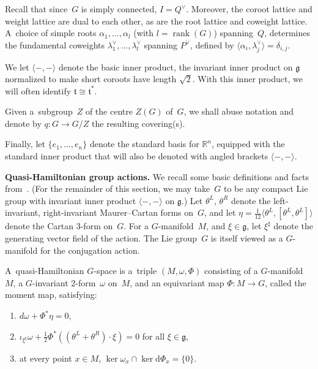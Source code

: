 \documentclass[11pt]{article}
\numberwithin{equation}{section}
\DeclareMathOperator{\rank}{rank}
\begin{document}
Recall that since~$G$ is simply connected, $I=Q^\vee$.
Moreover, the coroot lattice and weight lattice are dual to each other, as are the root lattice and coweight lattice.
A~choice of simple roots $\alpha_1, \ldots, \alpha_l$ (with $l=\rank(G)$) spanning~$Q$, determines the fundamental
coweights $\lambda_1^\vee, \ldots, \lambda_l^\vee$ spanning $P^\vee$, def\/ined by $\langle\alpha_i,\lambda_j^\vee
\rangle=\delta_{i,j}$.

We let $\langle-,-\rangle$ denote the basic inner product, the invariant inner product on $\mathfrak{g}$ normalized to
make short coroots have length $\sqrt{2}$.
With this inner product, we will often identify $\mathfrak{t} \cong \mathfrak{t}^*$.

Given a~subgroup~$Z$ of the centre $Z(G)$ of~$G$, we shall abuse notation and denote by $q:G\to G/Z$ the resulting
covering(s).

Finally, let $\{e_1, \ldots, e_n\}$ denote the standard basis for ${\mathbb{R}}^n$, equipped with the standard inner
product that will also be denoted with angled brackets $\langle -, - \rangle$.

{\bf Quasi-Hamiltonian group actions.}
We recall some basic def\/initions and facts from~\cite{AMM}.
(For the remainder of this section, we may take~$G$ to be any compact Lie group with invariant inner product
$\langle-,-\rangle$ on $\mathfrak{g}$.) Let $\theta^L$, $\theta^R$ denote the left-invariant, right-invariant
Maurer--Cartan forms on~$G$, and let $\eta= \tfrac{1}{12} \langle \theta^L, [\theta^L,\theta^L] \rangle $ denote the
Cartan 3-form on~$G$.
For a $G$-manifold~$M$, and $\xi \in \mathfrak{g}$, let $\xi^\sharp$ denote the generating vector f\/ield of the action.
The Lie group~$G$ is itself viewed as a $G$-manifold for the conjugation action.

\begin{Definition}
\label{def:quasi}
A~quasi-Hamiltonian $G$-space is a~triple $(M,\omega,\Phi)$ consisting of a $G$-manifold $M$,
a $G$-invariant 2-form~$\omega$ on~$M$, and an equivariant map $\Phi\colon M \to G$, called the moment map, satisfying:
\begin{enumerate}\itemsep=0pt
\item[i)] $d\omega + \Phi^* \eta = 0 $,
\item[ii)] $\iota_{\xi^\sharp}\omega +\tfrac{1}{2} \Phi^*((\theta^L + \theta^R) \cdot \xi)=0$ for all $\xi \in \mathfrak{g}$,
\item[iii)] at every point $x\in M$, $\ker \omega_x \cap \ker \mathrm{d} \Phi_x = \{0\}$.
\end{enumerate}
\end{Definition}
\end{document}
